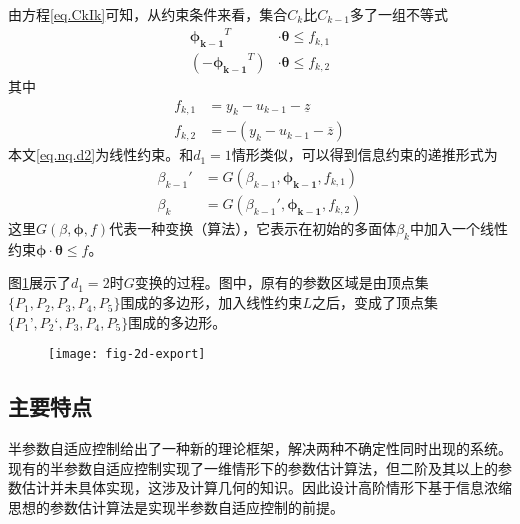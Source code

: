 由方程\eqref{eq.CkIk}可知，从约束条件来看，集合$C_{k}$比$C_{k-1}$多了一组不等式
\begin{equation}%
\label{eq.nq.d2}
\begin{split}%
\bm{\phi_{k-1}}^{T}&\cdot\bm{\theta}\leq f_{k,1}\\
(-\bm{\phi_{k-1}}^{T})&\cdot\bm{\theta}\leq f_{k,2}
\end{split}
\end{equation}
其中
\begin{equation}%
\label{eq.fk}
\begin{split}%
f_{k,1}&=y_{k}-u_{k-1}-\underline{z}\\
f_{k,2}&=-(y_{k}-u_{k-1}-\overline{z})
\end{split}
\end{equation}
本文\eqref{eq.nq.d2}为线性约束。和$d_{1}=1$情形类似，可以得到信息约束的递推形式为
\begin{equation}%
\begin{split}%
\beta_{k-1}'&=G(\beta_{k-1},\bm{\phi_{k-1}},f_{k,1})\\
\beta_{k}&=G(\beta_{k-1}',\bm{\phi_{k-1}},f_{k,2})
\end{split}
\end{equation}
这里$G(\beta,\bm{\phi},f)$代表一种变换（算法），它表示在初始的多面体$\beta_{k}$中加入一个线性约束$\bm{\phi}\cdot\bm{\theta}\leq f$。

图\ref{fig.2d.G}展示了$d_{1}=2$时$G$变换的过程。图中，原有的参数区域是由顶点集$\{P_{1},P_{2},P_{3},P_{4},P_{5}\}$围成的多边形，加入线性约束$L$之后，变成了顶点集$\{P_{1}’,P_{2}‘,P_{3},P_{4},P_{5}\}$围成的多边形。
\begin{figure}
	\centering
	\texttt{[image: fig-2d-export]}\\	 %
	\caption{}
	\label{fig.2d.G}
\end{figure}


\begin{algo}%
\label{algo:d=2}
\end{algo}
\subsection{主要特点}
半参数自适应控制给出了一种新的理论框架，解决两种不确定性同时出现的系统。现有的半参数自适应控制实现了一维情形下的参数估计算法，但二阶及其以上的参数估计并未具体实现，这涉及计算几何的知识。因此设计高阶情形下基于信息浓缩思想的参数估计算法是实现半参数自适应控制的前提。
